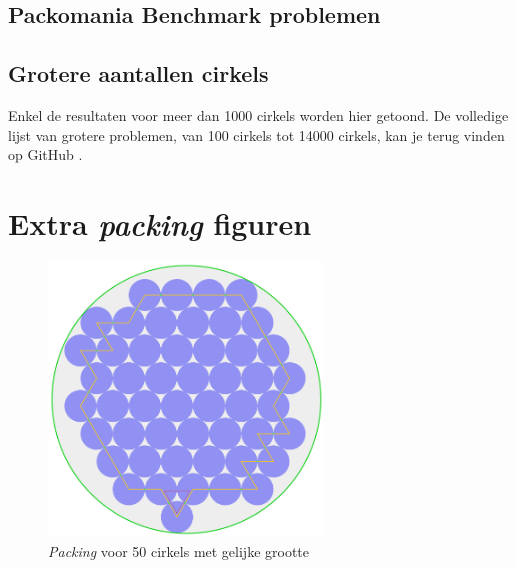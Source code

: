 \documentclass[12pt,a4paper,oneside]{book}
\begin{document}
{\section{Packomania Benchmark problemen} \label{append:packomania-tabellen-benchmark}


\section{Grotere aantallen cirkels} \label{append:packomania-tabellen-groter-aantal-cirkels}

Enkel de resultaten voor meer dan 1000 cirkels worden hier getoond.
De volledige lijst van grotere problemen, van 100 cirkels tot 14000 cirkels, kan je terug vinden op GitHub \cite{packomania-tables-github}.






\chapter{Extra \textit{packing} figuren} \label{append:extra-packing-figuren}


\begin{figure}
  \centering
  \includegraphics[width=0.65\textwidth]{packing-even-groot-50.png}
  \caption{\textit{Packing} voor 50 cirkels met gelijke grootte}
\end{figure}

}
\end{document}
